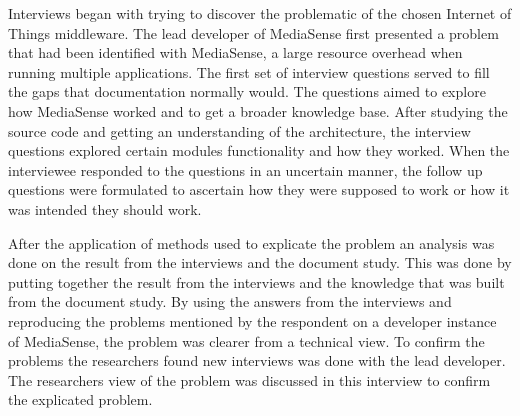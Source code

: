 Interviews began with trying to discover the problematic of the chosen Internet of Things middleware. The lead developer of MediaSense first presented a problem that had been identified with MediaSense, a large resource overhead when running multiple applications. The first set of interview questions served to fill the gaps that documentation normally would. The questions aimed to explore how MediaSense worked and to get a broader knowledge base. After studying the source code and getting an understanding of the architecture, the interview questions explored certain modules functionality and how they worked. When the interviewee responded to the questions in an uncertain manner, the follow up questions were formulated to ascertain how they were supposed to work or how it was intended they should work.

After the application of methods used to explicate the problem an analysis was done on the result from the interviews and the document study. This was done by putting together the result from the interviews and the knowledge that was built from the document study. By using the answers from the interviews and reproducing the problems mentioned by the respondent on a developer instance of MediaSense, the problem was clearer from a technical view. To confirm the problems the researchers found new interviews was done with the lead developer. The researchers view of the problem was discussed in this interview to confirm the explicated problem.